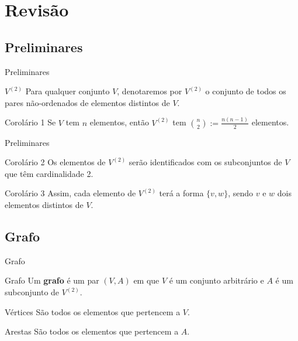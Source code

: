\documentclass[xcolor=dvipsnames,table]{beamer}
\begin{document}
    \section{Revisão}
	
	\subsection{Preliminares}
	\begin{frame}{Preliminares}
		\begin{block}{$V^{(2)}$}
			Para qualquer conjunto $V$, denotaremos por $V^{(2)}$ o conjunto de todos os pares não-ordenados de elementos distintos de $V$.
		\end{block}
		
		\begin{block}{Corolário 1}
			Se $V$ tem $n$ elementos, então $V^{(2)}$ tem ${n \choose 2} := \frac{n(n-1)}{2}$ elementos.
		\end{block}
	\end{frame}
	
	\begin{frame}{Preliminares}
		\begin{block}{Corolário 2}
			Os elementos de $V^{(2)}$ serão identificados com os subconjuntos de $V$ que têm cardinalidade 2.
		\end{block}
		
		\begin{block}{Corolário 3}
			Assim, cada elemento de $V^{(2)}$ terá a forma $\{ v,w \}$, sendo $v$ e $w$ dois elementos distintos de $V$.
		\end{block}
	\end{frame}
	
	
	\subsection{Grafo}
	\begin{frame}{Grafo}
		\begin{block}{Grafo}
			Um {\bf grafo} é um par $(V,A)$ em que $V$ é um conjunto arbitrário e $A$ é um subconjunto de $V^{(2)}$.
		\end{block}
		
		\begin{block}{Vértices}
			São todos os elementos que pertencem a $V$.
		\end{block}
		
		\begin{block}{Arestas}
			São todos os elementos que pertencem a $A$.
		\end{block}
	\end{frame}
	
\end{document}

